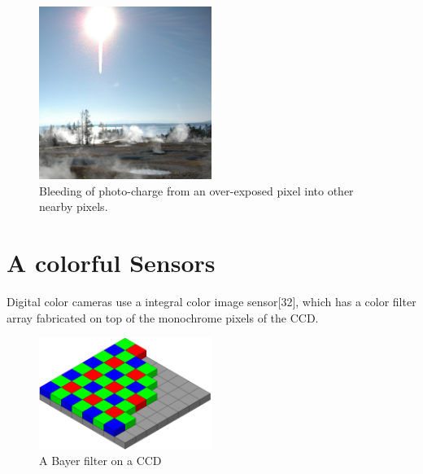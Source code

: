 \documentclass{loyola-beamer}
\begin{document}
\begin{frame}
	\begin{figure}
		\begin{center}
			\includegraphics[width=0.5\textwidth]{./figures/Blooming_ccd.jpg}
		\end{center}
		\caption{Bleeding of photo-charge from an over-exposed pixel into other nearby pixels.}
	\end{figure}
\end{frame}

\section{A colorful Sensors}
\begin{frame}
	Digital color cameras use a integral color image sensor[32], which has a color filter array fabricated on top of the monochrome pixels of the CCD.

	\begin{figure}
		\begin{center}
			\includegraphics[width=0.5\textwidth]{./figures/bayer.png}
		\end{center}
		\caption{A Bayer filter on a CCD}
	\end{figure}
\end{frame}
\end{document}
